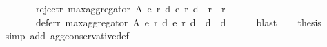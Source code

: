 \begin{isabellebody}
\ \ \ \ \ \ \ \ \ \ \ \ reject{\isacharunderscore}{\kern0pt}r\ {\isacharparenleft}{\kern0pt}max{\isacharunderscore}{\kern0pt}aggregator\ A\ {\isacharparenleft}{\kern0pt}e{}{\isacharcomma}{\kern0pt}\ r{}{\isacharcomma}{\kern0pt}\ d{}{\isacharparenright}{\kern0pt}\ {\isacharparenleft}{\kern0pt}e{}{\isacharcomma}{\kern0pt}\ r{}{\isacharcomma}{\kern0pt}\ d{}{\isacharparenright}{\kern0pt}{\isacharparenright}{\kern0pt}\ {\isasymsubseteq}\ {\isacharparenleft}{\kern0pt}r{}\ {\isasymunion}\ r{}{\isacharparenright}{\kern0pt}\ {\isasymand}\isanewline
\ \ \ \ \ \ \ \ \ \ \ \ defer{\isacharunderscore}{\kern0pt}r\ {\isacharparenleft}{\kern0pt}max{\isacharunderscore}{\kern0pt}aggregator\ A\ {\isacharparenleft}{\kern0pt}e{}{\isacharcomma}{\kern0pt}\ r{}{\isacharcomma}{\kern0pt}\ d{}{\isacharparenright}{\kern0pt}\ {\isacharparenleft}{\kern0pt}e{}{\isacharcomma}{\kern0pt}\ r{}{\isacharcomma}{\kern0pt}\ d{}{\isacharparenright}{\kern0pt}{\isacharparenright}{\kern0pt}\ {\isasymsubseteq}\ {\isacharparenleft}{\kern0pt}d{}\ {\isasymunion}\ d{}{\isacharparenright}{\kern0pt}{\isacharparenright}{\kern0pt}{\isachardoublequoteclose}\isanewline
\ \ \ \ \isamarkupfalse%
\ blast\isanewline
\ \ \isamarkupfalse%
\ {\isacharquery}{\kern0pt}thesis\isanewline
\ \ \ \ \isamarkupfalse%
\ {\isacharparenleft}{\kern0pt}simp\ add{\isacharcolon}{\kern0pt}\ agg{\isacharunderscore}{\kern0pt}conservative{\isacharunderscore}{\kern0pt}def{\isacharparenright}{\kern0pt}\isanewline
{}\isamarkupfalse%
%
\endisatagproof
{\isafoldproof}%
%
\isadelimproof
\isanewline
%
\endisadelimproof
%
\isadelimtheory
\isanewline
%
\endisadelimtheory
%
\isatagtheory
{}\isamarkupfalse%
%
\endisatagtheory
{\isafoldtheory}%
%
\isadelimtheory
%
\endisadelimtheory
%
\end{isabellebody}%
\endinput
